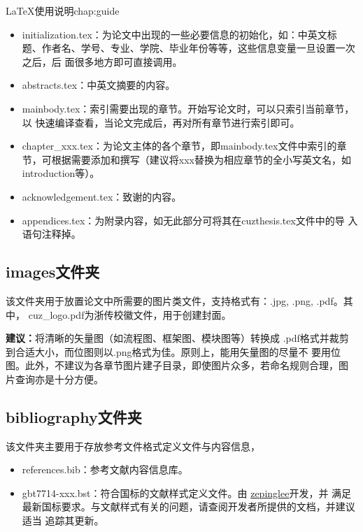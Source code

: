 \begin{cuzchapter}{\LaTeX{}使用说明}{chap:guide}
\begin{itemize}
    \item initialization.tex：为论文中出现的一些必要信息的初始化，如：中英文标
    题、作者名、学号、专业、学院、毕业年份等等，这些信息变量一旦设置一次之后，后
    面很多地方即可直接调用。
    \item abstracts.tex：中英文摘要的内容。
    \item mainbody.tex：索引需要出现的章节。开始写论文时，可以只索引当前章节，以
    快速编译查看，当论文完成后，再对所有章节进行索引即可。
    \item chapter{\_}xxx.tex：为论文主体的各个章节，即mainbody.tex文件中索引的章
    节，可根据需要添加和撰写（建议将xxx替换为相应章节的全小写英文名，如
    introduction等）。
    \item acknowledgement.tex：致谢的内容。
    \item appendices.tex：为附录内容，如无此部分可将其在cuzthesis.tex文件中的导
    入语句注释掉。
\end{itemize}

\subsection{images文件夹}\label{sub:images-folder}

该文件夹用于放置论文中所需要的图片类文件，支持格式有：.jpg, .png, .pdf。其中，
cuz{\_}logo.pdf为浙传校徽文件，用于创建封面。


\begin{leftbar}
    \noindent\textbf{建议：}将清晰的矢量图（如流程图、框架图、模块图等）转换成
    .pdf格式并裁剪到合适大小，而位图则以.png格式为佳。原则上，能用矢量图的尽量不
    要用位图。此外，不建议为各章节图片建子目录，即使图片众多，若命名规则合理，图
    片查询亦是十分方便。
\end{leftbar}

\subsection{bibliography文件夹}\label{sub:bibliography}

该文件夹主要用于存放参考文件格式定义文件与内容信息，

\begin{itemize}
    \item references.bib：参考文献内容信息库。
    \item gbt7714-xxx.bst：符合国标的文献样式定义文件。由
    \href{https://github.com/zepinglee/gbt7714-bibtex-style}{zepinglee}开发，并
    满足最新国标要求。与文献样式有关的问题，请查阅开发者所提供的文档，并建议适当
    追踪其更新。
\end{itemize}


\end{cuzchapter}
